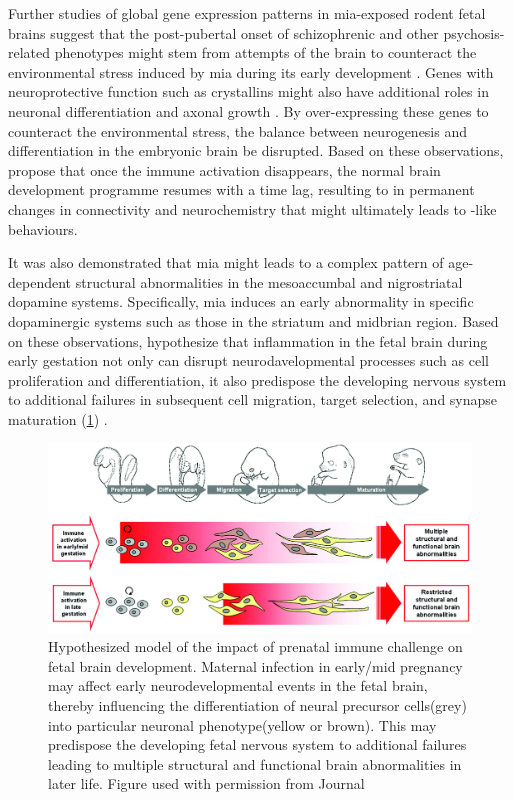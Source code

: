 	Further studies of global gene expression patterns in \gls{mia}-exposed rodent fetal brains \citep{Oskvig2012,Garbett2012a} suggest that the post-pubertal onset of schizophrenic and other psychosis-related phenotypes might stem from attempts of the brain to counteract the environmental stress induced by \gls{mia} during its early development \citep{Garbett2012a}.
	Genes with neuroprotective function such as crystallins might also have additional roles in neuronal differentiation and axonal growth \citep{Garbett2012a}. 
	By over-expressing these genes to counteract the environmental stress, the balance between neurogenesis and differentiation in the embryonic brain be disrupted. 
	Based on these observations, \citet{Garbett2012a} propose that once the immune activation disappears, the normal brain development programme resumes with a time lag, resulting to in permanent changes in connectivity and neurochemistry that might ultimately leads to -like behaviours.
	
	It was also demonstrated that \gls{mia} might leads to a complex pattern of age-dependent structural abnormalities in the mesoaccumbal and nigrostriatal dopamine systems\citep{Vuillermot2010}.
	Specifically, \gls{mia} induces an early abnormality in specific dopaminergic systems such as those in the striatum and midbrian region\citep{Vuillermot2010}.
	Based on these observations, \citet{Meyer2007a} hypothesize that inflammation in the fetal brain during early gestation not only can disrupt neurodavelopmental processes such as cell proliferation and differentiation, it also predispose the developing nervous system to additional failures in subsequent cell migration, target selection, and synapse maturation (\cref{fig:miaEffect}) \citep{Meyer2007a}.
	\begin{figure}
		\centering
		\includegraphics[width=\textwidth]{figure/mia_impact.jpg}
		\caption[Hypothesized model of the impact of prenatal immune challenge on fetal brain development]{Hypothesized model of the impact of prenatal immune challenge on fetal brain development.
			Maternal infection in early/mid pregnancy may affect early neurodevelopmental events in the fetal brain, thereby influencing the differentiation of neural precursor cells(grey) into particular neuronal phenotype(yellow or brown).
			This may predispose the developing fetal nervous system to additional failures leading to multiple structural and functional brain abnormalities in later life.
			Figure used with permission from Journal \citep{Meyer2007a}}
		\label{fig:miaEffect}
	\end{figure}
	

